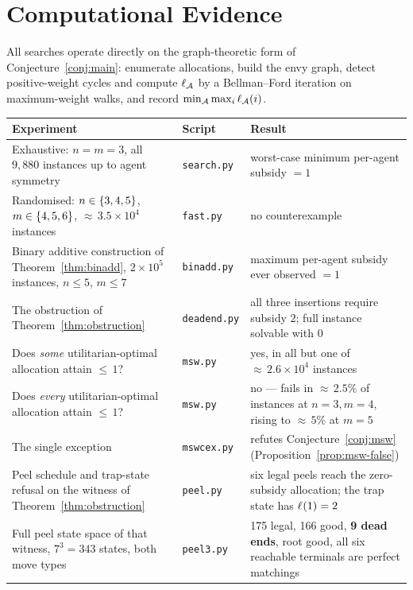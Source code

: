 \section{Computational Evidence}
\label{sec:experiments}

All searches operate directly on the graph-theoretic form of
Conjecture~\ref{conj:main}: enumerate allocations, build the envy graph, detect
positive-weight cycles and compute $\ell_{\mathcal{A}}$ by a Bellman--Ford
iteration on maximum-weight walks, and record
$\min_{\mathcal{A}} \max_i \ell_{\mathcal{A}}(i)$.

\begin{center}
\begin{tabular}{@{}p{}p{}p{}@{}}
\toprule
Experiment & Script & Result \\
\midrule
Exhaustive: $n = m = 3$, all $9{,}880$ instances up to agent symmetry
  & \texttt{search.py} & worst-case minimum per-agent subsidy $= 1$ \\
Randomised: $n \in \left\{3,4,5\right\}$, $m \in \left\{4,5,6\right\}$, ${\approx}\,3.5\times10^4$
instances
  & \texttt{fast.py} & no counterexample \\
Binary additive construction of Theorem~\ref{thm:binadd}, $2\times10^5$
instances, $n \le 5$, $m \le 7$
  & \texttt{binadd.py} & maximum per-agent subsidy ever observed $= 1$ \\
The obstruction of Theorem~\ref{thm:obstruction}
  & \texttt{deadend.py} & all three insertions require subsidy $2$; full
    instance solvable with $0$ \\
Does \emph{some} utilitarian-optimal allocation attain ${\le}\,1$?
  & \texttt{msw.py} & yes, in all but one of ${\approx}\,2.6\times10^4$
    instances \\
Does \emph{every} utilitarian-optimal allocation attain ${\le}\,1$?
  & \texttt{msw.py} & no --- fails in ${\approx}\,2.5\%$ of instances at
    $n=3, m=4$, rising to ${\approx}\,5\%$ at $m = 5$ \\
The single exception
  & \texttt{mswcex.py} & refutes Conjecture~\ref{conj:msw}
    (Proposition~\ref{prop:msw-false}) \\
\midrule
Peel schedule and trap-state refusal on the witness of
Theorem~\ref{thm:obstruction}
  & \texttt{peel.py} & six legal peels reach the zero-subsidy allocation; the
    trap state has $\ell_{}(1) = 2$ \\
Full peel state space of that witness, $7^3 = 343$ states, both move types
  & \texttt{peel3.py} & 175 legal, 166 good, \textbf{9 dead ends}, root good,
    all six reachable terminals are perfect matchings \\
\bottomrule
\end{tabular}
\end{center}

